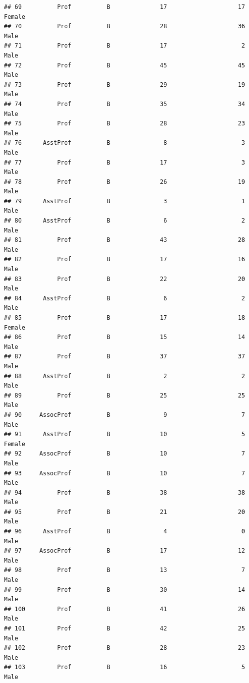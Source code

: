 \documentclass[]{article}
\begin{document}
\begin{verbatim}
## 69          Prof          B              17                    17 Female
## 70          Prof          B              28                    36   Male
## 71          Prof          B              17                     2   Male
## 72          Prof          B              45                    45   Male
## 73          Prof          B              29                    19   Male
## 74          Prof          B              35                    34   Male
## 75          Prof          B              28                    23   Male
## 76      AsstProf          B               8                     3   Male
## 77          Prof          B              17                     3   Male
## 78          Prof          B              26                    19   Male
## 79      AsstProf          B               3                     1   Male
## 80      AsstProf          B               6                     2   Male
## 81          Prof          B              43                    28   Male
## 82          Prof          B              17                    16   Male
## 83          Prof          B              22                    20   Male
## 84      AsstProf          B               6                     2   Male
## 85          Prof          B              17                    18 Female
## 86          Prof          B              15                    14   Male
## 87          Prof          B              37                    37   Male
## 88      AsstProf          B               2                     2   Male
## 89          Prof          B              25                    25   Male
## 90     AssocProf          B               9                     7   Male
## 91      AsstProf          B              10                     5 Female
## 92     AssocProf          B              10                     7   Male
## 93     AssocProf          B              10                     7   Male
## 94          Prof          B              38                    38   Male
## 95          Prof          B              21                    20   Male
## 96      AsstProf          B               4                     0   Male
## 97     AssocProf          B              17                    12   Male
## 98          Prof          B              13                     7   Male
## 99          Prof          B              30                    14   Male
## 100         Prof          B              41                    26   Male
## 101         Prof          B              42                    25   Male
## 102         Prof          B              28                    23   Male
## 103         Prof          B              16                     5   Male

\end{verbatim}
\end{document}
